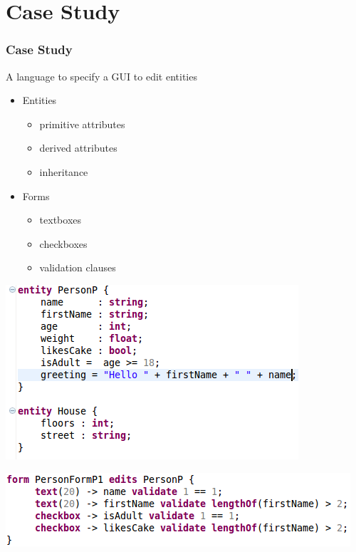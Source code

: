 \section{Case Study}

\begin{frame}
  \frametitle{Case Study}
  A language to specify a GUI to edit entities
  
  \begin{itemize}
    \item Entities
    \begin{itemize}
      \item primitive attributes
      \item derived attributes
      \item inheritance
    \end{itemize}
    \item Forms
    \begin{itemize}
      \item textboxes
      \item checkboxes
      \item validation clauses
    \end{itemize}
    
  \end{itemize}



\includegraphics[width=.7\textwidth]{img/entities.png}

\includegraphics[width=.8\textwidth]{img/personform.png}

\end{frame}
